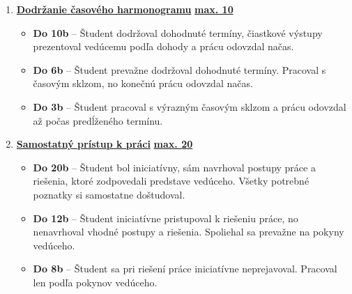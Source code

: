 \begin{enumerate}[label=\textbf{\arabic*.}]
    \item \underline{\textbf{Dodržanie časového harmonogramu}} \hfill \underline{\textbf{max. 10}}
    
    \begin{itemize}
        \item \textbf{Do 10b} – Študent dodržoval dohodnuté termíny, čiastkové výstupy prezentoval vedúcemu podľa dohody a prácu odovzdal načas.
        \item \textbf{Do 6b} – Študent prevažne dodržoval dohodnuté termíny. Pracoval s časovým sklzom, no konečnú prácu odovzdal načas.
        \item \textbf{Do 3b} – Študent pracoval s výrazným časovým sklzom a prácu odovzdal až počas predĺženého termínu.
    \end{itemize}

    \item \underline{\textbf{Samostatný prístup k práci}} \hfill \underline{\textbf{max. 20}}
    
    \begin{itemize}
        \item \textbf{Do 20b} – Študent bol iniciatívny, sám navrhoval postupy práce a riešenia, ktoré zodpovedali predstave vedúceho. Všetky potrebné poznatky si samostatne doštudoval.
        \item \textbf{Do 12b} – Študent iniciatívne pristupoval k riešeniu práce, no nenavrhoval vhodné postupy a riešenia. Spoliehal sa prevažne na pokyny vedúceho.
        \item \textbf{Do 8b} – Študent sa pri riešení práce iniciatívne neprejavoval. Pracoval len podľa pokynov vedúceho.
    \end{itemize}

\end{enumerate}
